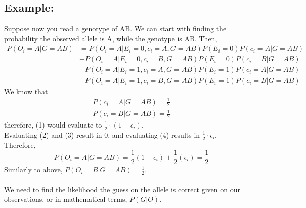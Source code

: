 \documentclass[10pt]{article}
\begin{document}
\subsection*{Example:}
Suppose now you read a genotype of AB.  We can start with finding the probability the observed allele is A, while the genotype is AB.
Then,
\begin{align}
    P(O_i = A \vert G = AB) &= P(O_i = A | E_i = 0, c_i = A, G = AB) P(E_i = 0) P(c_i = A \vert G = AB) \\
    &+ P(O_i = A \vert E_i = 0, c_i = B, G = AB) P(E_i = 0) P(c_i = B \vert G = AB)\\
    &+ P(O_i = A \vert E_i = 1, c_i = A, G = AB) P(E_i = 1) P(c_i = A \vert G = AB)\\
    &+ P(O_i = A \vert E_i = 1, c_i = B, G = AB) P(E_i = 1) P(c_i = B \vert G = AB)
\end{align}
We know that
\begin{align*}
    P(c_i = A \vert G = AB) = \frac{1}{2}\\
    P(c_i = B \vert G = AB) = \frac{1}{2}
\end{align*}
therefore, (1) would evaluate to $\frac{1}{2} \cdot (1 - \epsilon_i)$.\\
Evaluating (2) and (3) result in 0, and evaluating (4) results in $\frac{1}{2} \cdot \epsilon_i$.\\
Therefore,
\[P(O_i = A \vert G = AB) = \frac{1}{2}(1 - \epsilon_i) + \frac{1}{2}(\epsilon_i) = \frac{1}{2}\]
Similarly to above, $P(O_i = B \vert G = AB) = \frac{1}{2}$.\\\\
We need to find the likelihood the guess on the allele is correct given on our observations, or in mathematical terms, $P(G \vert O)$.
\end{document}
